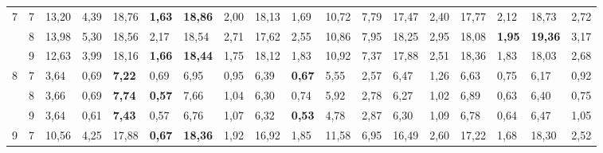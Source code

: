 \documentclass[conference]{IEEEtran}
\begin{document}
\begin{table}[]
\begin{tabular}{|cl|ll|ll|ll|ll|ll|ll|ll|ll|}
		\multicolumn{1}{|c|}{\multirow{3}{*}{7}} & 7 & \multicolumn{1}{l|}{13,20} & 4,39 & \multicolumn{1}{l|}{18,76} & \textbf{1,63} & \multicolumn{1}{l|}{\textbf{18,86}} & 2,00 & \multicolumn{1}{l|}{18,13} & 1,69 & \multicolumn{1}{l|}{10,72} & 7,79 & \multicolumn{1}{l|}{17,47} & 2,40 & \multicolumn{1}{l|}{17,77} & 2,12 & \multicolumn{1}{l|}{18,73} & 2,72 \\ \cline{2-18} 
		\multicolumn{1}{|c|}{} & 8 & \multicolumn{1}{l|}{13,98} & 5,30 & \multicolumn{1}{l|}{18,56} & 2,17 & \multicolumn{1}{l|}{18,54} & 2,71 & \multicolumn{1}{l|}{17,62} & 2,55 & \multicolumn{1}{l|}{10,86} & 7,95 & \multicolumn{1}{l|}{18,25} & 2,95 & \multicolumn{1}{l|}{18,08} & \textbf{1,95} & \multicolumn{1}{l|}{\textbf{19,36}} & 3,17 \\ \cline{2-18} 
		\multicolumn{1}{|c|}{} & 9 & \multicolumn{1}{l|}{12,63} & 3,99 & \multicolumn{1}{l|}{18,16} & \textbf{1,66} & \multicolumn{1}{l|}{\textbf{18,44}} & 1,75 & \multicolumn{1}{l|}{18,12} & 1,83 & \multicolumn{1}{l|}{10,92} & 7,37 & \multicolumn{1}{l|}{17,88} & 2,51 & \multicolumn{1}{l|}{18,36} & 1,83 & \multicolumn{1}{l|}{18,03} & 2,68 \\ \hline
		\multicolumn{1}{|c|}{\multirow{3}{*}{8}} & 7 & \multicolumn{1}{l|}{3,64} & 0,69 & \multicolumn{1}{l|}{\textbf{7,22}} & 0,69 & \multicolumn{1}{l|}{6,95} & 0,95 & \multicolumn{1}{l|}{6,39} & \textbf{0,67} & \multicolumn{1}{l|}{5,55} & 2,57 & \multicolumn{1}{l|}{6,47} & 1,26 & \multicolumn{1}{l|}{6,63} & 0,75 & \multicolumn{1}{l|}{6,17} & 0,92 \\ \cline{2-18} 
		\multicolumn{1}{|c|}{} & 8 & \multicolumn{1}{l|}{3,66} & 0,69 & \multicolumn{1}{l|}{\textbf{7,74}} & \textbf{0,57} & \multicolumn{1}{l|}{7,66} & 1,04 & \multicolumn{1}{l|}{6,30} & 0,74 & \multicolumn{1}{l|}{5,92} & 2,78 & \multicolumn{1}{l|}{6,27} & 1,02 & \multicolumn{1}{l|}{6,89} & 0,63 & \multicolumn{1}{l|}{6,40} & 0,75 \\ \cline{2-18} 
		\multicolumn{1}{|c|}{} & 9 & \multicolumn{1}{l|}{3,64} & 0,61 & \multicolumn{1}{l|}{\textbf{7,43}} & 0,57 & \multicolumn{1}{l|}{6,76} & 1,07 & \multicolumn{1}{l|}{6,32} & \textbf{0,53} & \multicolumn{1}{l|}{4,78} & 2,87 & \multicolumn{1}{l|}{6,30} & 1,09 & \multicolumn{1}{l|}{6,78} & 0,64 & \multicolumn{1}{l|}{6,47} & 1,05 \\ \hline
		\multicolumn{1}{|c|}{\multirow{3}{*}{9}} & 7 & \multicolumn{1}{l|}{10,56} & 4,25 & \multicolumn{1}{l|}{17,88} & \textbf{0,67} & \multicolumn{1}{l|}{\textbf{18,36}} & 1,92 & \multicolumn{1}{l|}{16,92} & 1,85 & \multicolumn{1}{l|}{11,58} & 6,95 & \multicolumn{1}{l|}{16,49} & 2,60 & \multicolumn{1}{l|}{17,22} & 1,68 & \multicolumn{1}{l|}{18,30} & 2,52 \\ \cline{2-18} 

\end{tabular}
\end{table}
\end{document}
